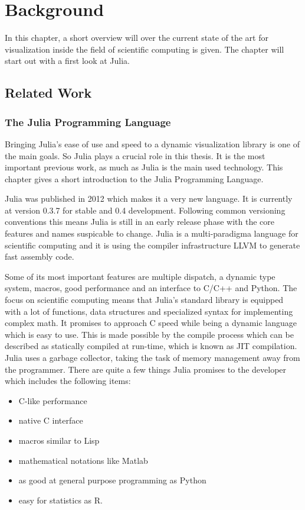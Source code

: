 \section{Background}

In this chapter, a short overview will over the current state of the art for visualization inside the field of scientific computing is given. The chapter will start out with a first look at Julia.

\subsection{Related Work}

\subsubsection{The Julia Programming Language}

Bringing Julia's ease of use and speed to a dynamic visualization library is one of the main goals.
So Julia plays a crucial role in this thesis. 
It is the most important previous work, as much as Julia is the main used technology.
This chapter gives a short introduction to the Julia Programming Language.

Julia was published in 2012 which makes it a very new language. It is currently at version 0.3.7 for stable and 0.4 development.
Following common versioning conventions this means Julia is still in an early release phase with the core features and names suspicable to change.
Julia is a multi-paradigma language for scientific computing and it is using the compiler infrastructure \ac{LLVM} to generate fast assembly code.

Some of its most important features are multiple dispatch, a dynamic type system, macros, good performance and an interface to C/C++ and Python.
The focus on scientific computing means that Julia's standard library is equipped with a lot of functions, data structures and specialized syntax for implementing complex math.
It promises to approach C speed while being a dynamic language which is easy to use.
This is made possible by the compile process which can be described as statically compiled at run-time, which is known as \ac{JIT} compilation.
Julia uses a garbage collector, taking the task of memory management away from the programmer.
There are quite a few things Julia promises to the developer which includes the following items\cite{WhyJulia}:

\begin{itemize}
	\item C-like performance
	\item native C interface
	\item macros similar to Lisp
	\item mathematical notations like Matlab
	\item as good at general purpose programming as Python
	\item easy for statistics as R.
\end{itemize}

